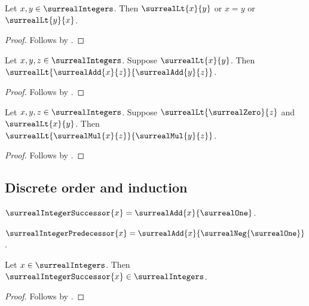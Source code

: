 \begin{theorem}\label{surreal_integer_order_trichotomy}
    Let $x,y\in\surrealIntegers$.
    Then $\surrealLt{x}{y}$ or $x=y$ or $\surrealLt{y}{x}$.
\end{theorem}
\begin{proof}
    Follows by
        .
\end{proof}

\begin{theorem}\label{surreal_integer_addition_order_compatible}
    Let $x,y,z\in\surrealIntegers$.
    Suppose $\surrealLt{x}{y}$.
    Then $\surrealLt{\surrealAdd{x}{z}}{\surrealAdd{y}{z}}$.
\end{theorem}
\begin{proof}
    Follows by
        .
\end{proof}

\begin{theorem}\label{surreal_integer_positive_multiplication_order_compatible}
    Let $x,y,z\in\surrealIntegers$.
    Suppose $\surrealLt{\surrealZero}{z}$ and $\surrealLt{x}{y}$.
    Then $\surrealLt{\surrealMul{x}{z}}{\surrealMul{y}{z}}$.
\end{theorem}
\begin{proof}
    Follows by
        .
\end{proof}

\subsection{Discrete order and induction}

\begin{definition}\label{surreal_integer_successor}
    $\surrealIntegerSuccessor{x}=\surrealAdd{x}{\surrealOne}$.
\end{definition}

\begin{definition}\label{surreal_integer_predecessor}
    $\surrealIntegerPredecessor{x}=
        \surrealAdd{x}{\surrealNeg{\surrealOne}}$.
\end{definition}

\begin{proposition}\label{surreal_integer_successor_closed}
    Let $x\in\surrealIntegers$.
    Then $\surrealIntegerSuccessor{x}\in\surrealIntegers$.
\end{proposition}
\begin{proof}
    Follows by
        .
\end{proof}

